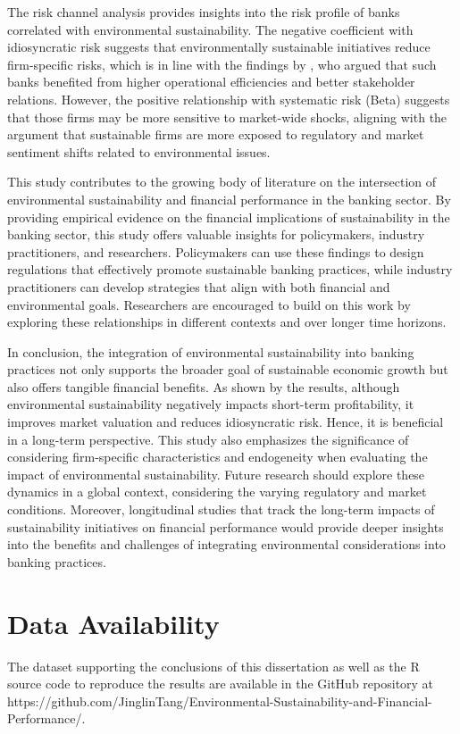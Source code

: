 \documentclass[11pt, a4paper]{article}
\begin{document}
The risk channel analysis provides insights into the risk profile of banks correlated with environmental sustainability. The negative coefficient with idiosyncratic risk suggests that environmentally sustainable initiatives reduce firm-specific risks, which is in line with the findings by \cite{Bouslah2013}, who argued that such banks benefited from higher operational efficiencies and better stakeholder relations. However, the positive relationship with systematic risk (Beta) suggests that those firms may be more sensitive to market-wide shocks, aligning with the argument that sustainable firms are more exposed to regulatory and market sentiment shifts related to environmental issues. 

This study contributes to the growing body of literature on the intersection of environmental sustainability and financial performance in the banking sector. By providing empirical evidence on the financial implications of sustainability in the banking sector, this study offers valuable insights for policymakers, industry practitioners, and researchers. Policymakers can use these findings to design regulations that effectively promote sustainable banking practices, while industry practitioners can develop strategies that align with both financial and environmental goals. Researchers are encouraged to build on this work by exploring these relationships in different contexts and over longer time horizons.

In conclusion, the integration of environmental sustainability into banking practices not only supports the broader goal of sustainable economic growth but also offers tangible financial benefits. As shown by the results, although environmental sustainability negatively impacts short-term profitability, it improves market valuation and reduces idiosyncratic risk. Hence, it is beneficial in a long-term perspective. This study also emphasizes the significance of considering firm-specific characteristics and endogeneity when evaluating the impact of environmental sustainability. Future research should explore these dynamics in a global context, considering the varying regulatory and market conditions. Moreover, longitudinal studies that track the long-term impacts of sustainability initiatives on financial performance would provide deeper insights into the benefits and challenges of integrating environmental considerations into banking practices. 

\newpage
\appendix
\section{Data Availability}
The dataset supporting the conclusions of this dissertation as well as the R source code to reproduce the results are available in the GitHub repository at https://github.com/JinglinTang/Environmental-Sustainability-and-Financial-Performance/.

\newpage



\end{document}
